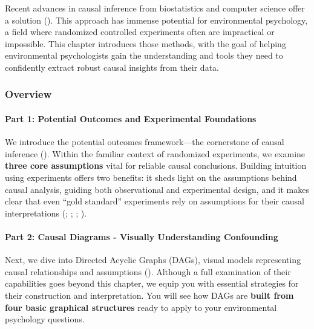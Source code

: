 \documentclass[
  singlecolumn]{article}
\let\oldparagraph\paragraph
\renewcommand{\paragraph}[1]{\oldparagraph{#1}\mbox{}}
\begin{document}
Recent advances in causal inference from biostatistics and computer
science offer a solution (). This approach has immense potential for environmental
psychology, a field where randomized controlled experiments often are
impractical or impossible. This chapter introduces those methods, with
the goal of helping environmental psychologists gain the understanding
and tools they need to confidently extract robust causal insights from
their data.

\subsubsection{Overview}\label{overview}

\paragraph{Part 1: Potential Outcomes and Experimental
Foundations}\label{part-1-potential-outcomes-and-experimental-foundations}

We introduce the potential outcomes framework---the cornerstone of
causal inference ().
Within the familiar context of randomized experiments, we examine
\textbf{three core assumptions} vital for reliable causal conclusions.
Building intuition using experiments offers two benefits: it sheds light
on the assumptions behind causal analysis, guiding both observational
and experimental design, and it makes clear that even ``gold standard''
experiments rely on assumptions for their causal interpretations
(;
;
;
).

\paragraph{Part 2: Causal Diagrams - Visually Understanding
Confounding}\label{part-2-causal-diagrams---visually-understanding-confounding}

Next, we dive into Directed Acyclic Graphs (DAGs), visual models
representing causal relationships and assumptions
(). Although a full examination of
their capabilities goes beyond this chapter, we equip you with essential
strategies for their construction and interpretation. You will see how
DAGs are \textbf{built from four basic graphical structures} ready to
apply to your environmental psychology questions.
\end{document}
